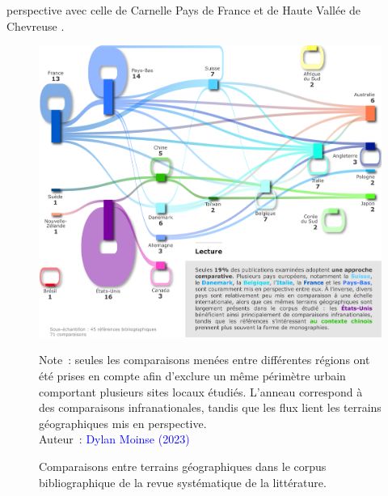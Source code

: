 \begin{refsegment}
perspective avec celle de Carnelle Pays de France et de Haute Vallée de Chevreuse \textcolor{blue}{\autocite[39]{stransky_periurbain_2019}}.%

    \begin{figure}[h!]\vspace*{4pt}
        \caption{Comparaisons entre terrains géographiques dans le corpus bibliographique de la revue systématique de la littérature.}
        \label{fig-chap2:comparaisons-internationales-rsl}
        \centerline{\includegraphics[width=1\columnwidth]{src/Figures/Chap-2/FR_RSL_Comparaisons_internationales.pdf}}
        \vspace{5pt}
        \begin{flushright}\scriptsize{
        Note~: seules les comparaisons menées entre différentes régions ont été prises en compte afin d'exclure un même périmètre urbain comportant plusieurs sites locaux étudiés. L'anneau correspond à des comparaisons infranationales, tandis que les flux lient les terrains géographiques mis en perspective.
        \\
        Auteur~: \textcolor{blue}{Dylan Moinse (2023)}
        }\end{flushright}
    \end{figure}


\end{refsegment}
